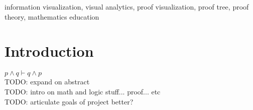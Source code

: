 \documentclass[conference]{IEEEtran}
\begin{document}
\newcommand{\sentencefive}{The proof visualization tool allows either open exploration of a proof or a directed walk-through, revealing supplementary information to serve as a form of discourse as the nodes are visited.}


\newcommand{\sentencesix}{This work provides a tool for gaining understanding of the structure of proofs, insight into the processes used in constructing such proofs, and also serves as a starting point for visualizations of proof trees in more complicated logics.}




\begin{abstract}
    \sentenceone{} \sentencetwo{} \sentencethree{} \sentencefour{} \sentencefive{} \sentencesix{}
\end{abstract}


\begin{IEEEkeywords}
    information visualization, visual analytics, proof visualization, proof tree, proof theory, mathematics education
\end{IEEEkeywords}


\section{Introduction}


$p \wedge q \vdash q \wedge p$ \\

TODO: expand on abstract \\

TODO: intro on math and logic stuff... proof... etc \\

TODO: articulate goals of project better? \\
\end{document}
